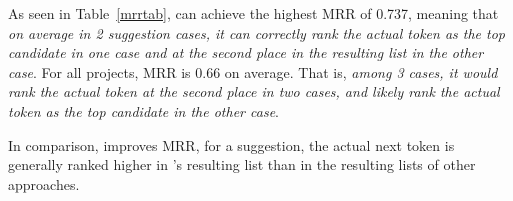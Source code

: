 As seen in Table~\ref{mrrtab}, {\tool} can achieve the highest MRR of
0.737, meaning that {\em on average in 2 suggestion cases, it can
  correctly rank the actual token as the top candidate in one case and
  at the second place in the resulting list in the other case}. For
all projects, MRR is 0.66 on average. That is, {\em among 3 cases, it
  would rank the actual token at the second place in two cases, and
  likely rank the actual token as the top candidate in the other
  case}.

In comparison, {\tool} improves MRR,
\ie for a suggestion, the actual next token is generally ranked
higher in {\tool}'s resulting list than in the resulting lists of
other approaches.





%
%

